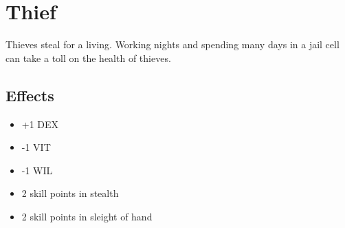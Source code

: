 \section{Thief}\label{background:thief}
Thieves steal for a living. Working nights and spending many days in a jail
cell can take a toll on the health of thieves.

\subsection{Effects}
\begin{itemize}
    \item +1 DEX
    \item -1 VIT
    \item -1 WIL
    \item 2 skill points in stealth
    \item 2 skill points in sleight of hand
\end{itemize}
